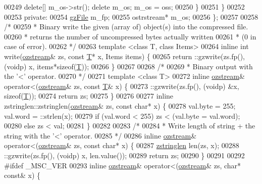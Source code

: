 \begin{DoxyCode}
00249                 \textcolor{keyword}{delete}[] m\_os->str(); \textcolor{keyword}{delete} m\_os; m\_os = oss;
00250             \}
00251         \}
00252 
00253     \textcolor{keyword}{private}:
00254         \hyperlink{structgz_file__s}{gzFile} m\_fp;
00255         ostrstream* m\_os;
00256 \};
00257 
00258 \textcolor{comment}{/*}
00259 \textcolor{comment}{ * Binary write the given (array of) object(s) into the compressed file.}
00260 \textcolor{comment}{ * returns the number of uncompressed bytes actually written}
00261 \textcolor{comment}{ * (0 in case of error).}
00262 \textcolor{comment}{ */}
00263 \textcolor{keyword}{template} <\textcolor{keyword}{class} T, \textcolor{keyword}{class} Items>
00264 \textcolor{keyword}{inline} \textcolor{keywordtype}{int} write(\hyperlink{classozstream}{ozstream}& zs, \textcolor{keyword}{const} \hyperlink{group___sparse_core___module}{T}* x, Items items) \{
00265     return ::gzwrite(zs.fp(), (voidp) x, items*\textcolor{keyword}{sizeof}(\hyperlink{group___sparse_core___module}{T}));
00266 \}
00267 
00268 \textcolor{comment}{/*}
00269 \textcolor{comment}{ * Binary output with the '<' operator.}
00270 \textcolor{comment}{ */}
00271 \textcolor{keyword}{template} <\textcolor{keyword}{class} T>
00272 \textcolor{keyword}{inline} \hyperlink{classozstream}{ozstream}& operator<(\hyperlink{classozstream}{ozstream}& zs, \textcolor{keyword}{const} \hyperlink{group___sparse_core___module}{T}& x) \{
00273     ::gzwrite(zs.fp(), (voidp) &x, \textcolor{keyword}{sizeof}(\hyperlink{group___sparse_core___module}{T}));
00274     \textcolor{keywordflow}{return} zs;
00275 \}
00276 
00277 \textcolor{keyword}{inline} zstringlen::zstringlen(\hyperlink{classozstream}{ozstream}& zs, \textcolor{keyword}{const} \textcolor{keywordtype}{char}* x) \{
00278     val.byte = 255;  val.word = ::strlen(x);
00279     \textcolor{keywordflow}{if} (val.word < 255) zs < (val.byte = val.word);
00280     \textcolor{keywordflow}{else} zs < val;
00281 \}
00282 
00283 \textcolor{comment}{/*}
00284 \textcolor{comment}{ * Write length of string + the string with the '<' operator.}
00285 \textcolor{comment}{ */}
00286 \textcolor{keyword}{inline} \hyperlink{classozstream}{ozstream}& operator<(\hyperlink{classozstream}{ozstream}& zs, \textcolor{keyword}{const} \textcolor{keywordtype}{char}* x) \{
00287     \hyperlink{classzstringlen}{zstringlen} len(zs, x);
00288     ::gzwrite(zs.fp(), (voidp) x, len.value());
00289     \textcolor{keywordflow}{return} zs;
00290 \}
00291 
00292 \textcolor{preprocessor}{#ifdef \_MSC\_VER}
00293 \textcolor{keyword}{inline} \hyperlink{classozstream}{ozstream}& operator<(\hyperlink{classozstream}{ozstream}& zs, \textcolor{keywordtype}{char}* \textcolor{keyword}{const}& x) \{

\end{DoxyCode}
